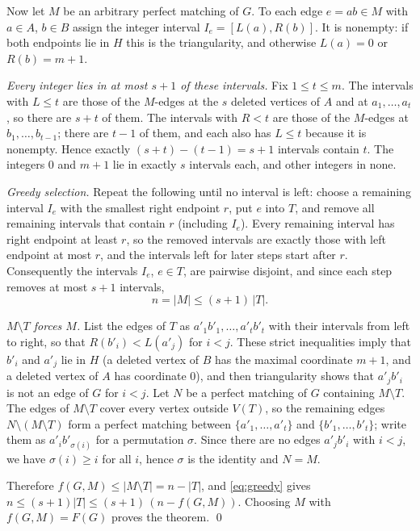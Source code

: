 \documentclass[11pt]{amsart}
\theoremstyle{remark}
\begin{document}
Now let $M$ be an arbitrary perfect matching of $G$.
To each edge $e=ab\in M$ with $a\in A$, $b\in B$ assign the integer interval $I_e=[L(a),R(b)]$.
It is nonempty: if both endpoints lie in $H$ this is the triangularity, and otherwise $L(a)=0$ or $R(b)=m+1$.

\emph{Every integer lies in at most $s+1$ of these intervals.}
Fix $1\le t\le m$.
The intervals with $L\le t$ are those of the $M$-edges at the $s$ deleted vertices of $A$ and at $a_1,\dots,a_t$, so there are $s+t$ of them.
The intervals with $R<t$ are those of the $M$-edges at $b_1,\dots,b_{t-1}$; there are $t-1$ of them, and each also has $L\le t$ because it is nonempty.
Hence exactly $(s+t)-(t-1)=s+1$ intervals contain $t$.
The integers $0$ and $m+1$ lie in exactly $s$ intervals each, and other integers in none.

\emph{Greedy selection.}
Repeat the following until no interval is left: choose a remaining interval $I_e$ with the smallest right endpoint $r$, put $e$ into $T$, and remove all remaining intervals that contain $r$ (including $I_e$).
Every remaining interval has right endpoint at least $r$, so the removed intervals are exactly those with left endpoint at most $r$, and the intervals left for later steps start after $r$.
Consequently the intervals $I_e$, $e\in T$, are pairwise disjoint, and since each step removes at most $s+1$ intervals,
\begin{equation}\label{eq:greedy}
n=|M|\le(s+1)\,|T|.
\end{equation}

\emph{$M\setminus T$ forces $M$.}
List the edges of $T$ as $a'_1b'_1,\dots,a'_tb'_t$ with their intervals from left to right, so that $R(b'_i)<L(a'_j)$ for $i<j$.
These strict inequalities imply that $b'_i$ and $a'_j$ lie in $H$ (a deleted vertex of $B$ has the maximal coordinate $m+1$, and a deleted vertex of $A$ has coordinate $0$), and then triangularity shows that $a'_jb'_i$ is not an edge of $G$ for $i<j$.
Let $N$ be a perfect matching of $G$ containing $M\setminus T$.
The edges of $M\setminus T$ cover every vertex outside $V(T)$, so the remaining edges $N\setminus(M\setminus T)$ form a perfect matching between $\{a'_1,\dots,a'_t\}$ and $\{b'_1,\dots,b'_t\}$; write them as $a'_ib'_{\sigma(i)}$ for a permutation $\sigma$.
Since there are no edges $a'_jb'_i$ with $i<j$, we have $\sigma(i)\ge i$ for all $i$, hence $\sigma$ is the identity and $N=M$.

Therefore $f(G,M)\le|M\setminus T|=n-|T|$, and \eqref{eq:greedy} gives $n\le(s+1)|T|\le(s+1)\,(n-f(G,M))$.
Choosing $M$ with $f(G,M)=F(G)$ proves the theorem. \qed
\end{document}
